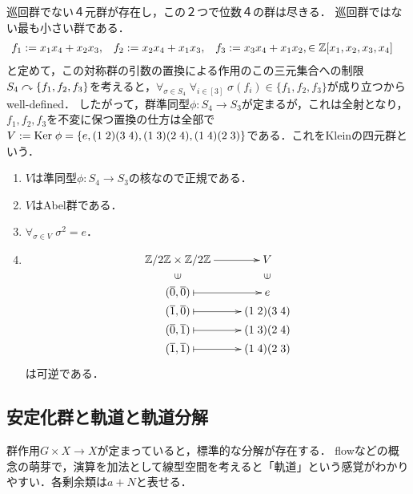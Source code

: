 \documentclass[uplatex,dvipdfmx]{jsreport}
\begin{document}
\begin{example}[Kleinの四元群]\label{exp-Klein-four-group}
    巡回群でない４元群が存在し，この２つで位数４の群は尽きる．
    巡回群ではない最も小さい群である．
    \begin{align*}
        f_1&:=x_1x_4+x_2x_3,&f_2&:=x_2x_4+x_1x_3,&f_3&:=x_3x_4+x_1x_2,\in\mathbb{Z}[x_1,x_2,x_3,x_4]
    \end{align*}
    と定めて，この対称群の引数の置換による作用のこの三元集合への制限$S_4\curvearrowright\{f_1,f_2,f_3\}$を考えると，$\forall_{\sigma\in S_4}\;\forall_{i\in[3]}\;\sigma(f_i)\in\{f_1,f_2,f_3\}$が成り立つからwell-defined．
    したがって，群準同型$\phi:S_4\to S_3$が定まるが，これは全射となり，$f_1,f_2,f_3$を不変に保つ置換の仕方は全部で$V:=\mathrm{Ker}\;\phi=\{e,(1\;2)(3\;4),(1\;3)(2\;4),(1\;4)(2\;3)\}$である．これをKleinの四元群という．
    \begin{proposition}[Kleinの四元群]\mbox{}
        \begin{enumerate}
            \item $V$は準同型$\phi:S_4\to S_3$の核なので正規である．
            \item $V$はAbel群である．
            \item $\forall_{\sigma\in V}\;\sigma^2=e$．
            \item \[\xymatrix@R-2pc{
                \Z/2\Z\times\Z/2\Z\ar[r]&V\\
                \rotatebox[origin=c]{90}{$\in$}&\rotatebox[origin=c]{90}{$\in$}\\
                (\o{0},\o{0})\ar@{|->}[r]&e\\
                (\o{1},\o{0})\ar@{|->}[r]&(1\;2)(3\;4)\\
                (\o{0},\o{1})\ar@{|->}[r]&(1\;3)(2\;4)\\
                (\o{1},\o{1})\ar@{|->}[r]&(1\;4)(2\;3)
            }\]
            は可逆である．
        \end{enumerate}
    \end{proposition}
\end{example}

\subsection{安定化群と軌道と軌道分解}

\begin{tcolorbox}[colframe=ForestGreen, colback=ForestGreen!10!white,breakable,colbacktitle=ForestGreen!40!white,coltitle=black,fonttitle=\bfseries\sffamily,
title=]
    群作用$G\times X\to X$が定まっていると，標準的な分解が存在する．
    flowなどの概念の萌芽で，演算を加法として線型空間を考えると「軌道」という感覚がわかりやすい．各剰余類は$a+N$と表せる．
\end{tcolorbox}
\end{document}

